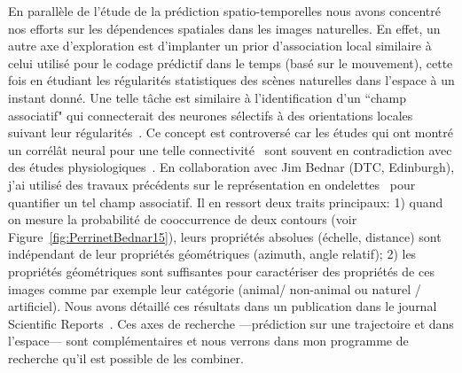 \documentclass[11pt,french,a4paper,oneside]{article}%
\begin{document}
En parallèle de l'étude de la prédiction spatio-temporelles nous avons concentré nos efforts sur les dépendences spatiales dans les images naturelles. 
En effet, un autre axe d'exploration est d'implanter un prior d'association local similaire à celui utilisé pour le codage prédictif dans le temps (basé sur le mouvement), cette fois en étudiant les régularités statistiques des scènes naturelles dans l'espace à un instant donné. Une telle tâche est similaire à l'identification d'un ``champ associatif" qui connecterait des neurones sélectifs à des orientations locales suivant leur régularités~\citep{Field93}. Ce concept est controversé car les études qui ont montré un corrélât neural pour une telle connectivité~\citep{Bosking97} sont souvent en contradiction avec des études physiologiques~\citep{Chavane11,Hunt12}. En collaboration avec Jim Bednar (DTC, Edinburgh), j'ai utilisé des travaux précédents sur le représentation en ondelettes~\citep{Fischer07cv} pour quantifier un tel champ associatif. Il en ressort deux traits principaux: 1) quand on mesure la probabilité de cooccurrence de deux contours (voir Figure~\ref{fig:PerrinetBednar15}), leurs propriétés absolues (échelle, distance) sont indépendant de leur propriétés géométriques (azimuth, angle relatif); 2) les propriétés géométriques sont suffisantes pour caractériser des propriétés de ces images comme par exemple leur catégorie (animal/ non-animal ou naturel / artificiel). Nous avons détaillé ces résultats dans un publication dans le journal Scientific Reports~\citep{PerrinetBednar15}. Ces axes de recherche ---prédiction sur une trajectoire et dans l'espace--- sont complémentaires et nous verrons dans mon programme de recherche qu'il est possible de les combiner. 
\end{document}
